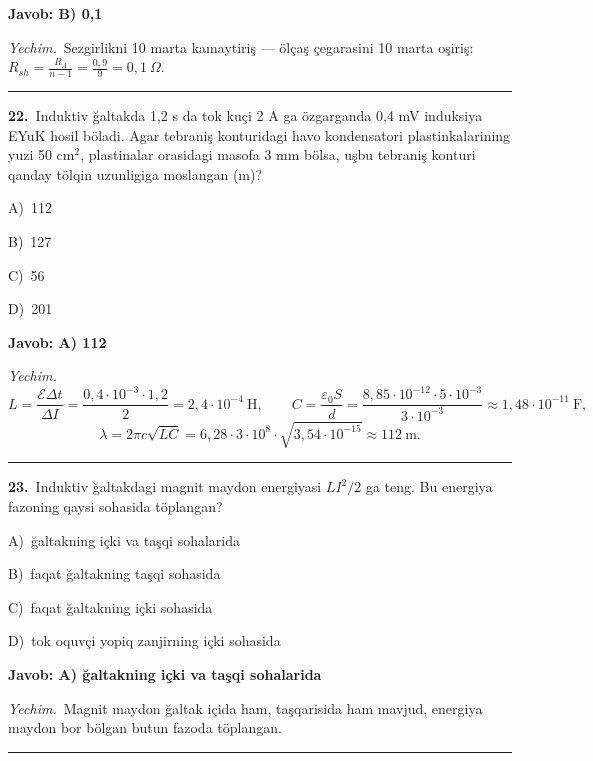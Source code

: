 \documentclass[11pt,a4paper]{article}
\newcommand{\opt}[2]{\hspace*{4mm}#1)\ #2\par}
\begin{document}
\noindent\colorbox{gray!12}{\parbox{\dimexpr\linewidth-2\fboxsep}{\textbf{Javob: B) 0,1}}}\par\smallskip
\noindent\textit{Yechim.}\ Sezgirlikni 10 marta kamaytiriş — ölçaş çegarasini 10 marta oşiriş: $R_{sh}=\frac{R_A}{n-1}=\frac{0{,}9}{9}=0{,}1\ \Omega$.\par\par\medskip\hrule\medskip
{}\noindent\begin{minipage}{\linewidth}
\textbf{22.}\ Induktiv ğaltakda 1,2 s da tok kuçi 2 A ga özgarganda 0,4 mV induksiya EYuK hosil böladi. Agar tebraniş konturidagi havo kondensatori plastinkalarining yuzi 50 cm$^{2}$, plastinalar orasidagi masofa 3 mm bölsa, uşbu tebraniş konturi qanday tölqin uzunligiga moslangan (m)?\par\smallskip
\opt{A}{112}
\opt{B}{127}
\opt{C}{56}
\opt{D}{201}
\end{minipage}\vspace{2pt}\par
\noindent\colorbox{gray!12}{\parbox{\dimexpr\linewidth-2\fboxsep}{\textbf{Javob: A) 112}}}\par\smallskip
\noindent\textit{Yechim.}\ \[L=\frac{\mathcal E\Delta t}{\Delta I}=\frac{0{,}4\cdot10^{-3}\cdot1{,}2}{2}=2{,}4\cdot10^{-4}\ \text{H},\qquad C=\frac{\varepsilon_0S}{d}=\frac{8{,}85\cdot10^{-12}\cdot5\cdot10^{-3}}{3\cdot10^{-3}}\approx1{,}48\cdot10^{-11}\ \text{F},\]
\[\lambda=2\pi c\sqrt{LC}=6{,}28\cdot3\cdot10^8\cdot\sqrt{3{,}54\cdot10^{-15}}\approx112\ \text{m}.\]\par\medskip\hrule\medskip
{}\noindent\begin{minipage}{\linewidth}
\textbf{23.}\ Induktiv ğaltakdagi magnit maydon energiyasi $LI^2/2$ ga teng. Bu energiya fazoning qaysi sohasida töplangan?\par\smallskip
\opt{A}{ğaltakning içki va taşqi sohalarida}
\opt{B}{faqat ğaltakning taşqi sohasida}
\opt{C}{faqat ğaltakning içki sohasida}
\opt{D}{tok oquvçi yopiq zanjirning içki sohasida}
\end{minipage}\vspace{2pt}\par
\noindent\colorbox{gray!12}{\parbox{\dimexpr\linewidth-2\fboxsep}{\textbf{Javob: A) ğaltakning içki va taşqi sohalarida}}}\par\smallskip
\noindent\textit{Yechim.}\ Magnit maydon ğaltak içida ham, taşqarisida ham mavjud, energiya maydon bor bölgan butun fazoda töplangan.\par\par\medskip\hrule\medskip
\end{document}
